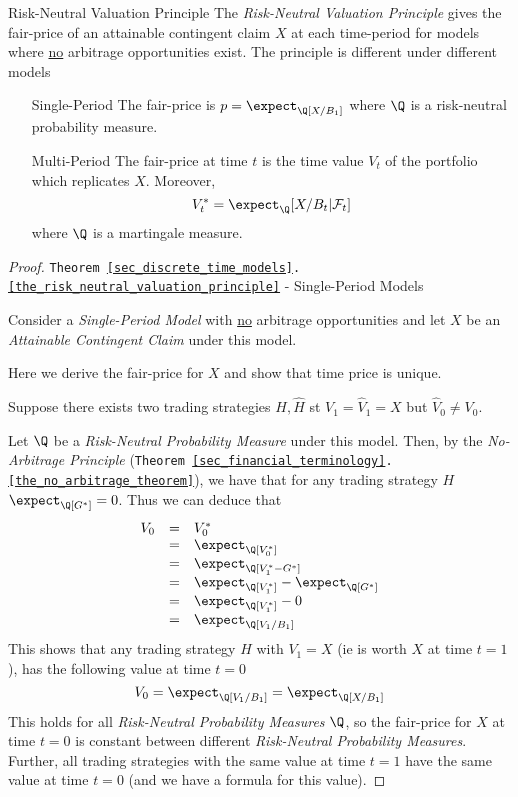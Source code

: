 \documentclass[11pt,a4paper]{article}
\begin{document}
  \begin{theorem}{Risk-Neutral Valuation Principle}\label{the_risk_neutral_valuation_principle}
    The \textit{Risk-Neutral Valuation Principle} gives the fair-price of an attainable contingent claim $X$ at each time-period for models where \underline{no} arbitrage opportunities exist. The principle is different under different models
    \begin{itemize}
      \item[Single-Period] The fair-price is $p=\expect_\Q[X/B_1]$ where $\Q$ is a risk-neutral probability measure.
      \item[Multi-Period] The fair-price at time $t$ is the time value $V_t$ of the portfolio which replicates $X$. Moreover,
      \[ V_t^*=\expect_\Q[X/B_t|\mathcal{F}_t] \]
      where $\Q$ is a martingale measure.
    \end{itemize}
  \end{theorem}

  \begin{proof}{\texttt{Theorem \ref{sec_discrete_time_models}.\ref{the_risk_neutral_valuation_principle}} - Single-Period Models}\label{prf_risk_neutral_valuation_principle_single_period}
    \par Consider a \textit{Single-Period Model} with \underline{no} arbitrage opportunities and let $X$ be an \textit{Attainable Contingent Claim} under this model.
    \par Here we derive the fair-price for $X$ and show that time price is unique.
    \par Suppose there exists two trading strategies $H,\hat{H}$ st $V_1=\hat{V}_1=X$ but $\hat{V}_0\neq V_0$.
    \par Let $\Q$ be a \textit{Risk-Neutral Probability Measure} under this model. Then, by the \textit{No-Arbitrage Principle} (\texttt{Theorem \ref{sec_financial_terminology}.\ref{the_no_arbitrage_theorem}}), we have that for any trading strategy $H$ $\expect_\Q[G^*]=0$. Thus we can deduce that
    \[\begin{array}{rcl}
      V_0&=&V_0^*\\
      &=&\expect_\Q[V_0^*]\\
      &=&\expect_\Q[V_1^*-G^*]\\
      &=&\expect_\Q[V_1^*]-\expect_\Q[G^*]\\
      &=&\expect_\Q[V_1^*]-0\\
      &=&\expect_\Q[V_1/B_1]
    \end{array}\]
    This shows that any trading strategy $H$ with $V_1=X$ (ie is worth $X$ at time $t=1$), has the following value at time $t=0$
    \[ V_0=\expect_\Q[V_1/B_1]=\expect_\Q[X/B_1] \]
    This holds for all \textit{Risk-Neutral Probability Measures} $\Q$, so the fair-price for $X$ at time $t=0$ is constant between different \textit{Risk-Neutral Probability Measures}. Further, all trading strategies with the same value at time $t=1$ have the same value at time $t=0$ (and we have a formula for this value).\proved
  \end{proof}
\end{document}
